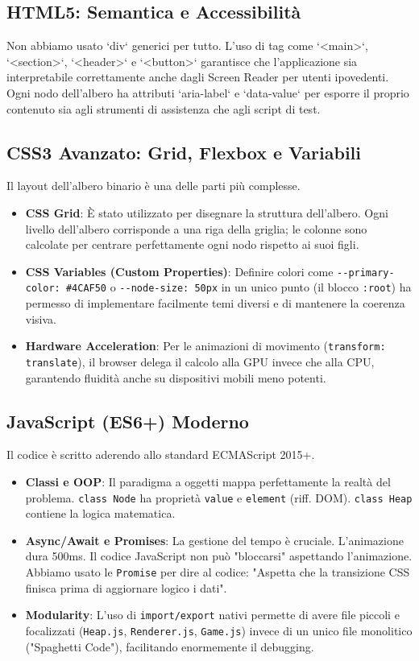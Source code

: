 \documentclass[openany]{theme/uniprthesis}
\begin{document}
\subsection{HTML5: Semantica e Accessibilità}
Non abbiamo usato `div` generici per tutto. L'uso di tag come `<main>`, `<section>`, `<header>` e `<button>` garantisce che l'applicazione sia interpretabile correttamente anche dagli Screen Reader per utenti ipovedenti. Ogni nodo dell'albero ha attributi `aria-label` e `data-value` per esporre il proprio contenuto sia agli strumenti di assistenza che agli script di test.

\subsection{CSS3 Avanzato: Grid, Flexbox e Variabili}
Il layout dell'albero binario è una delle parti più complesse.
\begin{itemize}
    \item \textbf{CSS Grid}: È stato utilizzato per disegnare la struttura dell'albero. Ogni livello dell'albero corrisponde a una riga della griglia; le colonne sono calcolate per centrare perfettamente ogni nodo rispetto ai suoi figli.
    \item \textbf{CSS Variables (Custom Properties)}: Definire colori come \texttt{-{}-primary-color: \#4CAF50} o \texttt{-{}-node-size: 50px} in un unico punto (il blocco \texttt{:root}) ha permesso di implementare facilmente temi diversi e di mantenere la coerenza visiva.
    \item \textbf{Hardware Acceleration}: Per le animazioni di movimento (\texttt{transform: translate}), il browser delega il calcolo alla GPU invece che alla CPU, garantendo fluidità anche su dispositivi mobili meno potenti.
\end{itemize}

\subsection{JavaScript (ES6+) Moderno}
Il codice è scritto aderendo allo standard ECMAScript 2015+.
\begin{itemize}
    \item \textbf{Classi e OOP}: Il paradigma a oggetti mappa perfettamente la realtà del problema. \texttt{class Node} ha proprietà \texttt{value} e \texttt{element} (riff. DOM). \texttt{class Heap} contiene la logica matematica.
    \item \textbf{Async/Await e Promises}: La gestione del tempo è cruciale. L'animazione dura 500ms. Il codice JavaScript non può "bloccarsi" aspettando l'animazione. Abbiamo usato le \texttt{Promise} per dire al codice: "Aspetta che la transizione CSS finisca prima di aggiornare logico i dati".
    \item \textbf{Modularity}: L'uso di \texttt{import/export} nativi permette di avere file piccoli e focalizzati (\texttt{Heap.js}, \texttt{Renderer.js}, \texttt{Game.js}) invece di un unico file monolitico ("Spaghetti Code"), facilitando enormemente il debugging.
\end{itemize}
\end{document}
